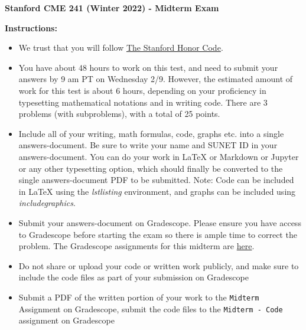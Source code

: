 \documentclass[12pt]{exam}
\begin{document}
\begin{center}
{\large {\bf Stanford CME 241 (Winter 2022) - Midterm Exam}}
\end{center}
{\large{\bf Instructions:}}
\begin{itemize}
\item We trust that you will follow \href{https://communitystandards.stanford.edu/policies-and-guidance/honor-code}{The Stanford Honor Code}.
\item You have about 48 hours to work on this test, and need to submit your answers by 9 am PT on Wednesday 2/9. However, the estimated amount of work for this test is about 6 hours, depending on your proficiency in typesetting mathematical notations and in writing code. There are 3 problems (with subproblems), with a total of 25 points.
\item Include all of your writing, math formulas, code, graphs etc. into a single answers-document. Be sure to write your name and SUNET ID in your answers-document. You can do your work in LaTeX or Markdown or Jupyter or any other typesetting option, which should finally be converted to the single answers-document PDF to be submitted. Note: Code can be included in LaTeX using the {\em lstlisting} environment, and graphs can be included using {\em includegraphics}.
\item Submit your answers-document on Gradescope. Please ensure you have access to Gradescope before starting the exam so there is ample time to correct the problem. The Gradescope assignments for this midterm are \href{https://www.gradescope.com/courses/245396}{here}.
\item Do not share or upload your code or written work publicly, and make sure to include the code files as part of your submission on Gradescope
\item Submit a PDF of the written portion of your work to the \verb|Midterm| Assignment on Gradescope, submit the code files to the \verb|Midterm - Code| assignment on Gradescope
\end{itemize}
\end{document}
